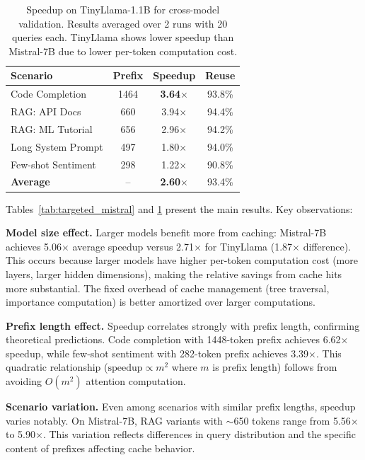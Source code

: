\documentclass[10pt,conference]{IEEEtran}
\begin{document}
\begin{table}[t]
\centering
\caption{Speedup on TinyLlama-1.1B for cross-model validation. Results averaged over 2 runs with 20 queries each. TinyLlama shows lower speedup than Mistral-7B due to lower per-token computation cost.}
\label{tab:targeted_tinyllama}
\begin{tabular}{lccc}
\toprule
Scenario & Prefix & Speedup & Reuse \\
\midrule
Code Completion & 1464 & \textbf{3.64$\times$} & 93.8\% \\
RAG: API Docs & 660 & 3.94$\times$ & 94.4\% \\
RAG: ML Tutorial & 656 & 2.96$\times$ & 94.2\% \\
Long System Prompt & 497 & 1.80$\times$ & 94.0\% \\
Few-shot Sentiment & 298 & 1.22$\times$ & 90.8\% \\
\midrule
\textbf{Average} & -- & \textbf{2.60$\times$} & 93.4\% \\
\bottomrule
\end{tabular}
\end{table}

Tables~\ref{tab:targeted_mistral} and \ref{tab:targeted_tinyllama} present the main results. Key observations:

\textbf{Model size effect.} Larger models benefit more from caching: Mistral-7B achieves 5.06$\times$ average speedup versus 2.71$\times$ for TinyLlama (1.87$\times$ difference). This occurs because larger models have higher per-token computation cost (more layers, larger hidden dimensions), making the relative savings from cache hits more substantial. The fixed overhead of cache management (tree traversal, importance computation) is better amortized over larger computations.

\textbf{Prefix length effect.} Speedup correlates strongly with prefix length, confirming theoretical predictions. Code completion with 1448-token prefix achieves 6.62$\times$ speedup, while few-shot sentiment with 282-token prefix achieves 3.39$\times$. This quadratic relationship ($\text{speedup} \propto m^2$ where $m$ is prefix length) follows from avoiding $O(m^2)$ attention computation.

\textbf{Scenario variation.} Even among scenarios with similar prefix lengths, speedup varies notably. On Mistral-7B, RAG variants with $\sim$650 tokens range from 5.56$\times$ to 5.90$\times$. This variation reflects differences in query distribution and the specific content of prefixes affecting cache behavior.
\end{document}
